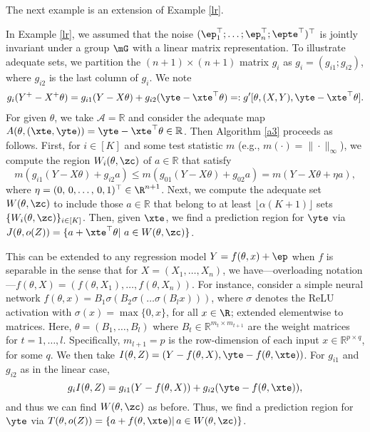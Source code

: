\documentclass[english]{article}
\begin{document}
The next example is an extension of Example \ref{lr}.

\begin{example}\label{linear-regression-adequate-set}
In Example \ref{lr}, we assumed that the noise $(\ep_1^\top;\ldots;\ep_n^\top;\epte^\top)^\top$ is jointly invariant under a  group $\mG$
with a linear matrix representation.
To illustrate adequate sets,
we partition the $(n+1)\times(n+1)$ matrix $g_i$ as $g_i = (g_{i1};g_{i2})$, where $g_{i2}$ is the last column of $g_i$. We note
\begin{align*}
    g_i(Y^+ - X^+\theta) = g_{i1}(Y-X\theta) + g_{i2}(\yte - \xte^\top \theta) =: g'[\theta,(X,Y),\yte-\xte^\top \theta].
\end{align*}
For given $\theta$, 
we take $\mathcal{A} = \mathbb{R}$ and consider the adequate map $A(\theta,(\xte,\yte)) = \yte - \xte^\top  \theta \in \mathbb{R}$. 
Then Algorithm \ref{a3} proceeds as follows.
First, for $i \in [K]$ and some test statistic $m$ (e.g., $m(\cdot)=\|\cdot\|_\infty$), we compute the region $W_i(\theta, \zc)$ of $a \in \mathbb{R}$ that satisfy 
    $$m(g_{i1}(Y-X\theta) + g_{i2}a) \leq m(g_{01}(Y-X\theta) + g_{02}a) = m(Y-X\theta + \eta a),$$ where $\eta = (0,\,0,\ldots,\,0,1)^\top \in \R^{n+1}$. %
Next, we compute the adequate set $W(\theta,\zc)$ to include those $a \in \mathbb{R}$ that belong to at least $\lfloor{\alpha (K+1)}\rfloor$ sets $\{ W_i(\theta, \zc)\}_{i\in[K]}$.
Then, given $\xte$, we find a prediction region for $\yte$ via 
$J(\theta, o(Z)) = \{a + \xte^\top \theta |\,\, a \in W(\theta, \zc)\}$.

This can be extended to any regression model $Y = f(\theta,x) + \ep$ when $f$ is separable in the sense that for $X = (X_1,\ldots,X_n)$, we have---overloading notation---$f(\theta,X) = (f(\theta,X_1),\ldots,f(\theta,X_n))$. 
For instance, consider a simple neural network $f(\theta,x) = B_1\sigma(B_2\sigma(\ldots \sigma(B_lx)))$, where $\sigma$ denotes the ReLU activation with $\sigma(x) = \max\{0,x\}$, 
for all $x\in \R$; extended elementwise to matrices.
Here, $\theta = (B_1,\ldots,B_l)$ 
where $B_t \in \mathbb{R}^{m_t \times m_{t+1}}$ are the weight matrices for $t=1,\ldots,l$. 
Specifically, $m_{l+1} = p$ is the row-dimension of each input $x \in \mathbb{R}^{p \times q}$, for some $q$. 
We then take $I(\theta,Z) = (
Y - f(\theta,X),\yte - f(\theta,\xte))$. 
For $g_{i1}$ and $g_{i2}$ as in the linear case,
$$g_iI(\theta,Z) = g_{i1} (Y - f(\theta,X)) + g_{i2} (\yte - f(\theta,\xte)),$$ 
and thus we can find $W(\theta,\zc)$ as before. 
Thus, we find a prediction region for $\yte$ via
$T(\theta, o(Z)) = \{a + f(\theta,\xte) |\, a \in W(\theta, \zc)\}$.
\end{example}
\end{document}
